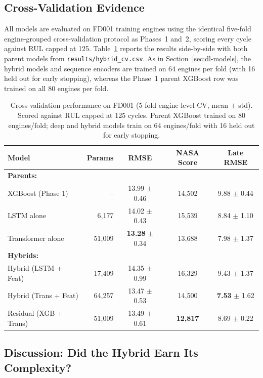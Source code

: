 \subsection{Cross-Validation Evidence}

All models are evaluated on FD001 training engines using the identical five-fold
engine-grouped cross-validation protocol as Phases~1 and~2, scoring every cycle
against RUL capped at 125. Table~\ref{tab:hybrid-cv} reports the results side-by-side
with both parent models from \texttt{results/hybrid\_cv.csv}. As in Section~\ref{sec:dl-models},
the hybrid models and sequence encoders are trained on 64 engines per fold (with 16
held out for early stopping), whereas the Phase~1 parent XGBoost row was trained
on all 80 engines per fold.

\begin{table}[t]
\centering
\caption{Cross-validation performance on FD001 (5-fold engine-level CV, mean $\pm$ std).
Scored against RUL capped at 125 cycles. Parent XGBoost trained on 80 engines/fold;
deep and hybrid models train on 64 engines/fold with 16 held out for early stopping.}
\label{tab:hybrid-cv}
\footnotesize
\begin{tabular}{lrccc}
\hline
Model & Params & RMSE & NASA Score & Late RMSE \\
\hline
\textbf{Parents:} & & & & \\
XGBoost (Phase 1) & -- & 13.99 $\pm$ 0.46 & 14,502 & 9.88 $\pm$ 0.44 \\
LSTM alone & 6,177 & 14.02 $\pm$ 0.43 & 15,539 & 8.84 $\pm$ 1.10 \\
Transformer alone & 51,009 & \textbf{13.28} $\pm$ 0.34 & 13,688 & 7.98 $\pm$ 1.37 \\
\hline
\textbf{Hybrids:} & & & & \\
Hybrid (LSTM + Feat) & 17,409 & 14.35 $\pm$ 0.99 & 16,329 & 9.43 $\pm$ 1.37 \\
Hybrid (Trans + Feat) & 64,257 & 13.47 $\pm$ 0.53 & 14,500 & \textbf{7.53} $\pm$ 1.62 \\
Residual (XGB + Trans) & 51,009 & 13.49 $\pm$ 0.61 & \textbf{12,817} & 8.69 $\pm$ 0.22 \\
\hline
\end{tabular}
\end{table}

\subsection{Discussion: Did the Hybrid Earn Its Complexity?}

